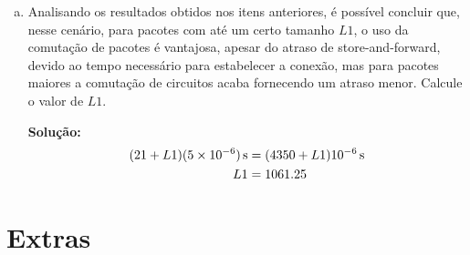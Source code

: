 \documentclass{article}
\begin{document}
\begin{enumerate}
\begin{enumerate}[a)]
\begin{addmargin}[0.5in]{0.5in}
\end{addmargin}

\item Analisando os resultados obtidos nos itens anteriores, é possível concluir que, nesse cenário, para pacotes com até um certo tamanho $L1$, o uso da comutação de pacotes é vantajosa, apesar do atraso de store-and-forward, devido ao tempo necessário para estabelecer a conexão, mas para pacotes maiores a comutação de circuitos acaba fornecendo um atraso menor. Calcule o valor de $L1$.

\begin{addmargin}[0.5in]{0.5in}
\par \textbf{Solução:}
\begin{equation} \label{eq2}
\begin{split}
\unit[(21 + L1)(5 \times 10^{-6})]{s} & = \unit[(4350 + L1) 10^{-6}]{s}\\
L1 & = 1061.25
\end{split}
\end{equation}
 
\end{addmargin}

\end{enumerate}
\end{enumerate}

\section*{Extras}
\end{document}
